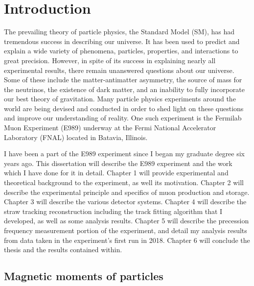 
\thispagestyle{myheadings}
\graphicspath{{Body/Figures/Theory/}}

\chapter{Introduction}
\label{chapter:Introduction}

The prevailing theory of particle physics, the Standard Model (SM), has had tremendous success in describing our universe. It has been used to predict and explain a wide variety of phenomena, particles, properties, and interactions to great precision. However, in spite of its success in explaining nearly all experimental results, there remain unanswered questions about our universe. Some of these include the matter-antimatter asymmetry, the source of mass for the neutrinos, the existence of dark matter, and an inability to fully incorporate our best theory of gravitation. Many particle physics experiments around the world are being devised and conducted in order to shed light on these questions and improve our understanding of reality. One such experiment is the Fermilab Muon \gmtwo Experiment (E989) underway at the Fermi National Accelerator Laboratory (FNAL) located in Batavia, Illinois.

I have been a part of the E989 experiment since I began my graduate degree six years ago. This dissertation will describe the E989 experiment and the work which I have done for it in detail. Chapter 1 will provide experimental and theoretical background to the experiment, as well its motivation. Chapter 2 will describe the experimental principle and specifics of muon production and storage. Chapter 3 will describe the various detector systems. Chapter 4 will describe the straw tracking reconstruction including the track fitting algorithm that I developed, as well as some analysis results. Chapter 5 will describe the precession frequency measurement portion of the experiment, and detail my analysis results from data taken in the experiment's first run in 2018. Chapter 6 will conclude the thesis and the results contained within.


\section{Magnetic moments of particles}
\label{sec:MDMs}

